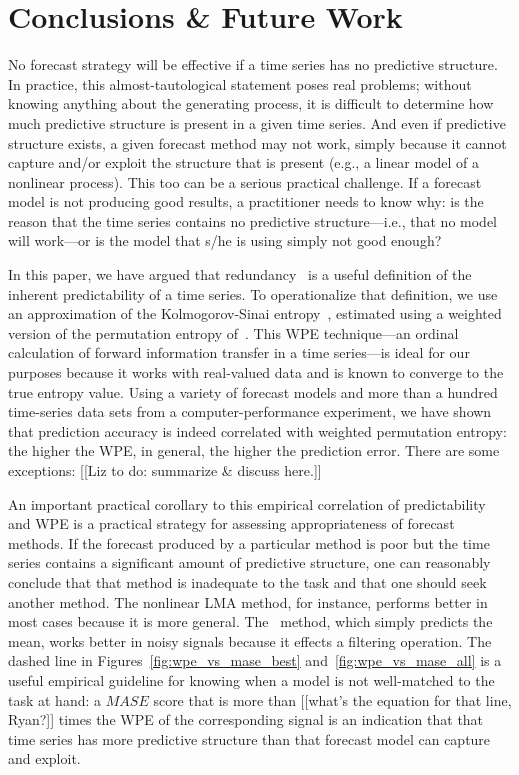 \section{ Conclusions \& Future Work }\label{sec:conc}

No forecast strategy will be effective if a time series has no
predictive structure.  In practice, this almost-tautological statement
poses real problems; without knowing anything about the generating
process, it is difficult to determine how much predictive structure is
present in a given time series.  And even if predictive structure
exists, a given forecast method may not work, simply because it cannot
capture and/or exploit the structure that is present (e.g., a linear
model of a nonlinear process).  This too can be a serious practical
challenge.  If a forecast model is not producing good results, a
practitioner needs to know why: is the reason that the time series
contains no predictive structure---i.e., that no model will work---or
is the model that s/he is using simply not good enough?

In this paper, we have argued that redundancy~\cite{crutchfield2003}
is a useful definition of the inherent predictability of a time
series.  To operationalize that definition, we use an approximation of
the Kolmogorov-Sinai entropy~\cite{lind95}, estimated using a weighted
version of the permutation entropy of~\cite{bandt2002per}.  This WPE
technique---an ordinal calculation of forward information transfer in
a time series---is ideal for our purposes because it works with
real-valued data and is known to converge to the true entropy value.
Using a variety of forecast models and more than a hundred time-series
data sets from a computer-performance experiment, we have shown that
prediction accuracy is indeed correlated with weighted permutation
entropy: the higher the WPE, in general, the higher the prediction
error.  There are some exceptions: [[Liz to do: summarize \& discuss
    here.]]


An important practical corollary to this empirical correlation of
predictability and WPE is a practical strategy for assessing
appropriateness of forecast methods.  If the forecast produced by a
particular method is poor but the time series contains a significant
amount of predictive structure, one can reasonably conclude that that
method is inadequate to the task and that one should seek another
method.  The nonlinear LMA method, for instance, performs better in
most cases because it is more general.  The \naive ~method, which
simply predicts the mean, works better in noisy signals because it
effects a filtering operation.  The dashed line in
Figures~\ref{fig:wpe_vs_mase_best} and~\ref{fig:wpe_vs_mase_all} is a
useful empirical guideline for knowing when a model is not
well-matched to the task at hand: a $MASE$ score that is more than
{\color{red}[[what's the equation for that line, Ryan?]]} times the
WPE of the corresponding signal is an indication that that time series
has more predictive structure than that forecast model can capture and
exploit.

